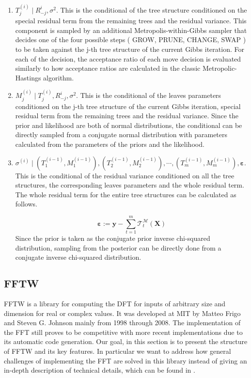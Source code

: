 \documentclass{usiinftr}
\begin{document}
\begin{enumerate}
\item $ T_j^{(i)} \mid R_{-j}^i, \sigma^2 $. This is the conditional of the tree structure conditioned on the special residual term from the remaining trees and the residual variance. This component is sampled by an additional Metropolis-within-Gibbs sampler that decides one of the four possible steps ( GROW, PRUNE, CHANGE, SWAP ) to be taken against the j-th tree structure of the current Gibbs iteration. For each of the decision, the acceptance ratio of each move decision is evaluated similarly to how acceptance ratios are calculated in the classic Metropolic-Hastings algorithm.
\item $ M_j^{(i)} \mid T_j^{(i)}, R_{-j}^i, \sigma^2 $. This is the conditional of the leaves parameters conditioned on the j-th tree structure of the current Gibbs iteration, special residual term from the remaining trees and the residual variance. Since the prior and likelihood are both of normal distributions, the conditional can be directly sampled from a conjugate normal distribution with parameters calculated from the parameters of the priors and the likelihood.
\item $\sigma^(i) \mid (T_1^{(i-1)},M_1^{(i-1)}),(T_2^{(i-1)},M_2^{(i-1)}), \cdots, (T_m^{(i-1)},M_m^{(i-1)}), \boldsymbol{\varepsilon}  $. This is the conditional of the residual variance conditioned on all the tree structures, the corresponding leaves parameters and the whole residual term. The whole residual term for the entire tree structures can be calculated as follows.

\begin{equation}
\boldsymbol{\varepsilon}:=\boldsymbol{y}-\sum_{t=1}^m \mathcal{T}_{t}^{\mathcal{M}}(\boldsymbol{X})
\end{equation}
Since the prior is taken as the conjugate prior inverse chi-squared distribution, sampling from the posterior can be directly done from a conjugate inverse chi-squared distribution.
\end{enumerate}



\subsection{FFTW}
FFTW is a library for computing the DFT for inputs of arbitrary size and dimension for real or complex values.
It was developed at MIT by Matteo Frigo and Steven G. Johnson mainly from 1998 through 2008\cite{JohnsonFr08:burrus}.
The implementation of the FFT still proves to be competitive with more recent implementations due to its automatic code generation.
Our goal, in this section is to present the structure of FFTW and its key features.
In particular we want to address how general challenges of implementing the FFT are solved in this library instead of giving an in-depth description of technical details, which  can be found in \cite{FFTW05}.
\end{document}
